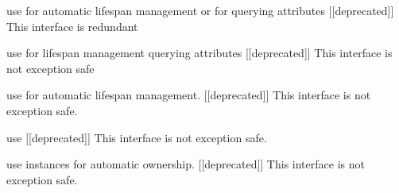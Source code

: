 \begin{DoxyRefList}
%
use  for automatic lifespan management or for querying attributes \mbox{[}\mbox{[}deprecated\mbox{]}\mbox{]} This interface is redundant  
\item[Member \doxylink{struct_ort_1_1_custom_op_api_a4459ff89e3d3513cfdb93a056e7c5a80}{Ort\+::Custom\+Op\+Api\+::Release\+Kernel\+Info} (\+\_\+\+Frees\+\_\+ptr\+\_\+opt\+\_\+ Ort\+Kernel\+Info \texorpdfstring{$\ast$}{*}info\+\_\+copy)]\label{deprecated__deprecated000028}%
%
use  for lifespan management querying attributes \mbox{[}\mbox{[}deprecated\mbox{]}\mbox{]} This interface is not exception safe  
\item[Member \doxylink{struct_ort_1_1_custom_op_api_a7be4089c35847e358f81307bceea8ca0}{Ort\+::Custom\+Op\+Api\+::Release\+Op} (\+\_\+\+Frees\+\_\+ptr\+\_\+opt\+\_\+ Ort\+Op \texorpdfstring{$\ast$}{*}ort\+\_\+op)]\label{deprecated__deprecated000025}%
%
use  for automatic lifespan management. \mbox{[}\mbox{[}deprecated\mbox{]}\mbox{]} This interface is not exception safe.  
\item[Member \doxylink{struct_ort_1_1_custom_op_api_a95c4ae684dbbc0ce51aefc24633c63ae}{Ort\+::Custom\+Op\+Api\+::Release\+Op\+Attr} (\+\_\+\+Frees\+\_\+ptr\+\_\+opt\+\_\+ Ort\+Op\+Attr \texorpdfstring{$\ast$}{*}op\+\_\+attr)]\label{deprecated__deprecated000022}%
%
use  \mbox{[}\mbox{[}deprecated\mbox{]}\mbox{]} This interface is not exception safe.  
\item[Member \doxylink{struct_ort_1_1_custom_op_api_a42981ee288830f4b60683bbd4a21627d}{Ort\+::Custom\+Op\+Api\+::Release\+Tensor\+Type\+And\+Shape\+Info} (Ort\+Tensor\+Type\+And\+Shape\+Info \texorpdfstring{$\ast$}{*}input)]\label{deprecated__deprecated000014}%
%
use  instances for automatic ownership. \mbox{[}\mbox{[}deprecated\mbox{]}\mbox{]} This interface is not exception safe.  
\item[Member \doxylink{struct_ort_1_1_custom_op_api_aee4f5addd047a93b71dc67adf2066766}{Ort\+::Custom\+Op\+Api\+::Set\+Dimensions} (Ort\+Tensor\+Type\+And\+Shape\+Info \texorpdfstring{$\ast$}{*}info, \+\_\+\+In\+\_\+ const int64\+\_\+t \texorpdfstring{$\ast$}{*}dim\+\_\+values, size\+\_\+t dim\+\_\+count)]\label{deprecated__deprecated000009}%

\end{DoxyRefList}
